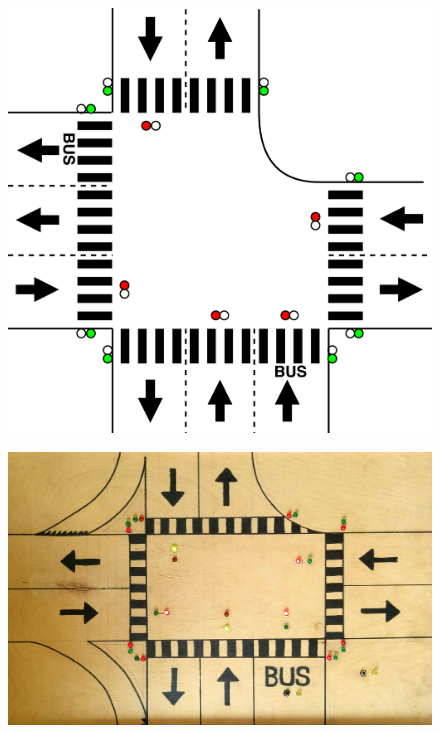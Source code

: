 \begin{figure}[H]\label{fig:crossroad}
\centering
\begin{minipage}{.5\textwidth}
  \centering
  \includegraphics[width=.8\linewidth]{../common/images/crossroad.png}
  \label{fig:test1}
\end{minipage}%
\begin{minipage}{.5\textwidth}
  \centering
  \includegraphics[width=.9\linewidth]{../common/images/wood-crossroad.jpg}
  \label{fig:test2}
\end{minipage}
\end{figure}


